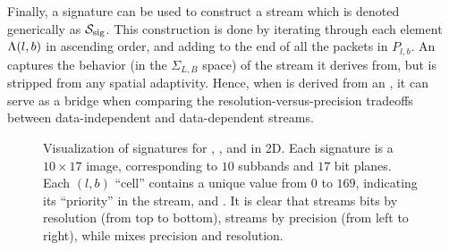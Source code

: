 Finally, a signature can be used to construct a stream which is denoted generically as $\ssig$. This
construction is done by iterating through each element $\sgn(l,b)$ in ascending order, and adding to
the end of \ssig all the packets in $P_{l,b}$. An \ssig captures the behavior (in the $\Sigma_{L,B}$
space) of the stream it derives from, but is stripped from any spatial adaptivity. Hence, when \ssig
is derived from an \sopt, it can serve as a bridge when comparing the resolution-versus-precision
tradeoffs between data-independent and data-dependent streams.

\begin{figure}[t]
\centering
\caption{Visualization of signatures for \slvl, \sbit, and \swav in 2D. Each signature is a $10\times
17$ image, corresponding to $10$ subbands  and $17$ bit planes. Each $(l,b)$ ``cell'' contains a
unique value from $0$ to $169$, indicating its ``priority'' in the stream, and 
. It is clear 
that \slvl streams bits
by resolution (from top to bottom), \sbit streams by precision (from left to right), while \swav
mixes precision and resolution.}
\label{fig:example-signatures}
\end{figure}

